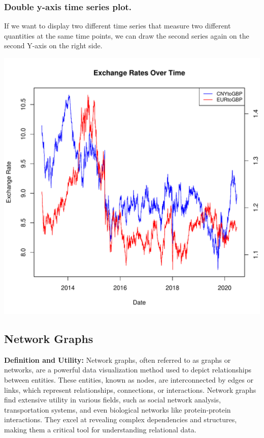 \documentclass{article}\usepackage[]{graphicx}\usepackage[]{xcolor}
\makeatletter
\def\maxwidth{ %
  \ifdim\Gin@nat@width>\linewidth
    \linewidth
  \else
    \Gin@nat@width
  \fi
}
\newenvironment{knitrout}{}{} %
\makeatother
\begin{document}
\subsubsection{Double y-axis time series plot.}

If we want to display two different time series that measure two different quantities at the same time points, we can draw the second series again on the second Y-axis on the right side.

\begin{knitrout}
\color{fgcolor}
\includegraphics[width=\maxwidth]{figure/unnamed-chunk-4-1} 
\end{knitrout}


\subsection{Network Graphs}
\textbf{Definition and Utility:}
Network graphs, often referred to as graphs or networks, are a powerful data visualization method used to depict relationships between entities. These entities, known as nodes, are interconnected by edges or links, which represent relationships, connections, or interactions. Network graphs find extensive utility in various fields, such as social network analysis, transportation systems, and even biological networks like protein-protein interactions. They excel at revealing complex dependencies and structures, making them a critical tool for understanding relational data.
\end{document}
